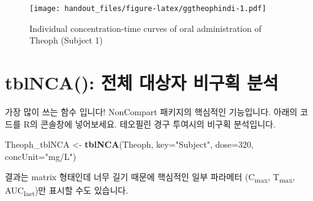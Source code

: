 \documentclass[9pt,]{krantz}
\newenvironment{Shaded}{\begin{snugshade}}{\end{snugshade}}
\newcommand{\KeywordTok}[1]{\textcolor[rgb]{0.13,0.29,0.53}{\textbf{#1}}}
\newcommand{\DataTypeTok}[1]{\textcolor[rgb]{0.13,0.29,0.53}{#1}}
\newcommand{\DecValTok}[1]{\textcolor[rgb]{0.00,0.00,0.81}{#1}}
\newcommand{\StringTok}[1]{\textcolor[rgb]{0.31,0.60,0.02}{#1}}
\newcommand{\OperatorTok}[1]{\textcolor[rgb]{0.81,0.36,0.00}{\textbf{#1}}}
\newcommand{\NormalTok}[1]{#1}
\begin{document}
\begin{Shaded}
\end{Shaded}

\begin{figure}
\centering
\texttt{[image: handout\_files/figure-latex/ggtheophindi-1.pdf]}
\caption{\label{fig:ggtheophindi}Individual concentration-time curves of
oral administration of Theoph (Subject 1)}
\end{figure}

\section{tblNCA(): 전체 대상자 비구획 분석}\label{tblnca----}

가장 많이 쓰는 함수 입니다! NonCompart 패키지의 핵심적인 기능입니다.
아래의 코드를 R의 콘솔창에 넣어보세요. 테오필린 경구 투여시의 비구획
분석입니다.

\begin{Shaded}
\begin{Highlighting}[]
\NormalTok{Theoph_tblNCA <-}\StringTok{ }\KeywordTok{tblNCA}\NormalTok{(Theoph, }\DataTypeTok{key=}\StringTok{"Subject"}\NormalTok{, }\DataTypeTok{dose=}\DecValTok{320}\NormalTok{, }\DataTypeTok{concUnit=}\StringTok{"mg/L"}\NormalTok{)}
\end{Highlighting}
\end{Shaded}

결과는 matrix 형태인데 너무 길기 때문에 핵심적인 일부 파라메터
(C\textsubscript{max}, T\textsubscript{max}, AUC\textsubscript{last})만
표시할 수도 있습니다.
\end{document}

